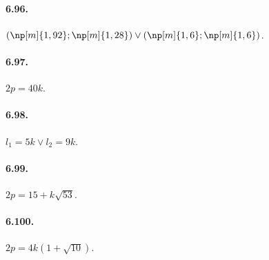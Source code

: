 \begin{multicols}{2}
\paragraph{6.96.} $(\np[m]{1,92};\np[m]{1,28})\vee(\np[m]{1,6};\np[m]{1,6})$.

\paragraph{6.97.} $2p=40k$.

\paragraph{6.98.} $l_1=5k\vee l_2=9k$.

\paragraph{6.99.} $2p=15+k\sqrt{53}$.

\paragraph{6.100.} $2p=4k(1+\sqrt{10})$.
\end{multicols}
